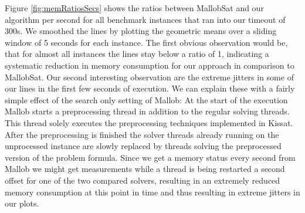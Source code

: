 \documentclass[12pt,a4paper,twoside]{scrartcl}
\numberwithin{equation}{section}
\begin{document}
Figure \ref{fig:memRatiosSecs} shows the ratios between MallobSat and our algorithm per second for all benchmark instances that ran into our timeout of 300s. We smoothed the lines by plotting the geometric means over a sliding window of 5 seconds for each instance. 
The first obvious observation would be, that for almost all instances the lines stay below a ratio of 1, indicating a systematic reduction in memory consumption for our approach in comparison to MallobSat.
Our second interesting observation are the extreme jitters in some of our lines in the first few seconds of execution. We can explain these with a fairly simple effect of the search only setting of Mallob: At the start of the execution Mallob starts a preprocessing thread in addition to the regular solving threads. This thread solely executes the preprocessing techniques implemented in Kissat. After the preprocessing is finished the solver threads already running on the unprocessed instance are slowly replaced by threads solving the preprocessed version of the problem formula. Since we get a memory status every second from Mallob we might get measurements while a thread is being restarted a second offset for one of the two compared solvers, resulting in an extremely reduced memory consumption at this point in time and thus resulting in extreme jitters in our plots.
\end{document}
